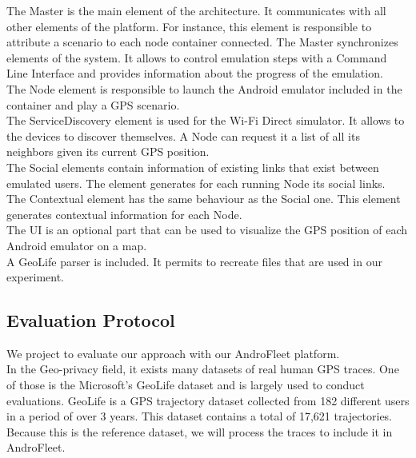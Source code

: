 The Master is the main element of the architecture.
It communicates with all other elements of the platform.
For instance, this element is responsible to attribute a scenario to each node container connected.
The Master synchronizes elements of the system.
It allows to control emulation steps with a Command Line Interface and provides information about the progress of the emulation.
\\

The Node element is responsible to launch the Android emulator included in the container and play a GPS scenario.
\\

The ServiceDiscovery element is used for the Wi-Fi Direct simulator.
It allows to the devices to discover themselves.
A Node can request it a list of all its neighbors given its current GPS position.
\\

The Social elements contain information of existing links that exist between emulated users.
The element generates for each running Node its social links.
\\

The Contextual element has the same behaviour as the Social one.
This element generates contextual information for each Node.
\\

The UI is an optional part that can be used to visualize the GPS position of each Android emulator on a map.
\\

A GeoLife parser is included.
It permits to recreate files that are used in our experiment.
\\

\subsection{Evaluation Protocol}

We project to evaluate our approach with our AndroFleet platform.
\\

In the Geo-privacy field, it exists many datasets of real human GPS traces.
One of those is the Microsoft’s GeoLife dataset and is largely used to conduct evaluations.
GeoLife is a GPS trajectory dataset collected from 182 different users in a period of over 3 years. 
This dataset contains a total of 17,621 trajectories.
Because this is the reference dataset, we will process the traces to include it in AndroFleet.
\\

